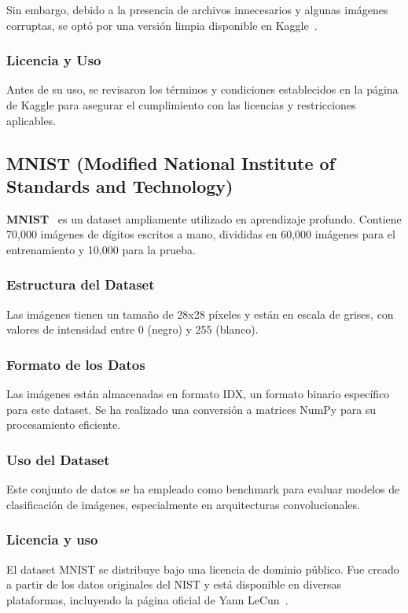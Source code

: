 Sin embargo, debido a la presencia de archivos innecesarios y algunas imágenes corruptas, se optó por una versión
limpia disponible en Kaggle~\cite{CleanedArtImages}.

\subsubsection{Licencia y Uso}
Antes de su uso, se revisaron los términos y condiciones establecidos en la página de Kaggle para asegurar el
cumplimiento con las licencias y restricciones aplicables.

\subsection{MNIST (Modified National Institute of Standards and Technology)}\label{subsec:mnist}
\textbf{MNIST}~\cite{MNISTDataset} es un dataset ampliamente utilizado en aprendizaje profundo.
Contiene 70,000 imágenes de dígitos escritos a mano, divididas en 60,000 imágenes para el entrenamiento y 10,000 para
la prueba.

\subsubsection{Estructura del Dataset}
Las imágenes tienen un tamaño de 28x28 píxeles y están en escala de grises, con valores de intensidad entre 0 (negro) y
255 (blanco).

\subsubsection{Formato de los Datos}
Las imágenes están almacenadas en formato IDX, un formato binario específico para este dataset.
Se ha realizado una conversión a matrices NumPy para su procesamiento eficiente.

\subsubsection{Uso del Dataset}
Este conjunto de datos se ha empleado como benchmark para evaluar modelos de clasificación de imágenes, especialmente
en arquitecturas convolucionales.

\subsubsection{Licencia y uso}
El dataset MNIST se distribuye bajo una licencia de dominio público.
Fue creado a partir de los datos originales del NIST y está disponible en diversas plataformas, incluyendo la página
oficial de Yann LeCun~\cite{lecunYannLeCunsWeb}.


